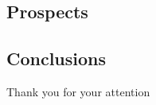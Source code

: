 \documentclass[compress,slidescentered,notes=show]{beamer}
\begin{document}
	\subsection{Prospects}
\begin{frame}
\end{frame}

	\subsection{Conclusions}
\begin{frame}
\end{frame}

\begin{frame}
\begin{center}
Thank you for your attention 
\end{center}
\end{frame}
\end{document}
